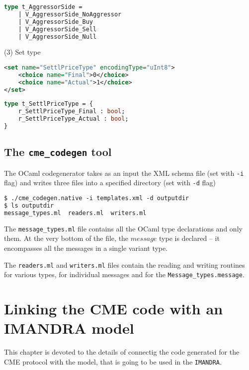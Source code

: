 \documentclass[twoside,a4paper]{refart}
\begin{document}
\begin{lstlisting}[language=ML]
type t_AggressorSide =
    | V_AggressorSide_NoAggressor
    | V_AggressorSide_Buy
    | V_AggressorSide_Sell
    | V_AggressorSide_Null
\end{lstlisting}

\begin{center} (3) Set type \end{center}
\begin{lstlisting}[language=XML]
<set name="SettlPriceType" encodingType="uInt8">
    <choice name="Final">0</choice>
    <choice name="Actual">1</choice>
</set>
\end{lstlisting}

\begin{lstlisting}[language=ML]
type t_SettlPriceType = {
    r_SettlPriceType_Final : bool;
    r_SettlPriceType_Actual : bool;
}
\end{lstlisting}

\newpage
\subsection{The \texttt{cme\_codegen} tool}

The OCaml codegenerator takes as an input the XML schema file (set with
\texttt{-i} flag) and writes three files into a specified directory (set with
\texttt{-d} flag)

\begin{lstlisting}[language=ML,basicstyle=\small\ttfamily]
$ ./cme_codegen.native -i templates.xml -d outputdir
$ ls outputdir
message_types.ml  readers.ml  writers.ml
\end{lstlisting}

The \texttt{message\_types.ml} file contains all the OCaml type declarations and
only them. At the very bottom of the file, the $message$ type is declared -- it
encompasses all the messages in a single variant type.

The \texttt{readers.ml} and \texttt{writers.ml} files contain the reading and
writing routines for various types, for individual messages and for the
\texttt{Message\_types.message}. 

\newpage
\section{Linking the CME code with an IMANDRA model}
This chapter is devoted to the details of connectig the code generated for the
CME protocol with the model, that is going to be used in the \texttt{IMANDRA}.

\begin{lstlisting}[language=ML,basicstyle=\small\ttfamily]
\end{lstlisting}
\end{document}
